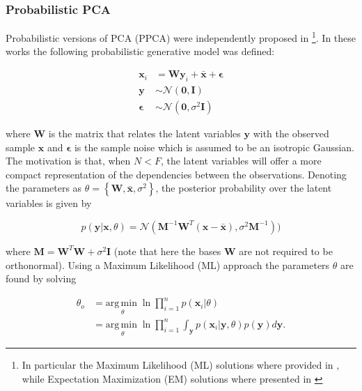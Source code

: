 
\subsubsection{Probabilistic PCA}
\label{sec:PPCA}

Probabilistic versions of PCA (PPCA) were independently proposed in \cite{Moghaddam1997,Roweis1998,Tipping1999} \footnote{In particular the Maximum Likelihood (ML)  solutions where provided  in \cite{Moghaddam1997,Tipping1999}, while Expectation Maximization (EM) solutions where presented in \cite{Roweis1998, Tipping1999}}. In these works the following probabilistic generative model was defined:

\begin{equation}
	\begin{aligned}
		\mathbf{x}_i & = \mathbf{W}\mathbf{y}_i + \bar{\mathbf{x}} + \boldsymbol{\epsilon}
		\\
		\mathbf{y} & \sim \mathcal{N}(\mathbf{0},\boldsymbol{\mathbf{I}}) 
		\\
		\boldsymbol{\epsilon} & \sim \mathcal{N}(\mathbf{0},\sigma^2\mathbf{I})
	\end{aligned}
	\label{eq:ppca_model}
\end{equation}

where $\mathbf{W}$ is the matrix that relates the latent variables $\mathbf{y}$ with the observed sample $\mathbf{x}$ and $\boldsymbol{\epsilon}$ is the sample noise which is assumed to be an isotropic Gaussian. The motivation is that, when $N < F$, the latent variables will offer a more compact representation of the dependencies between the observations. Denoting the parameters as $\theta = \left\{ \mathbf{W}, \bar{\mathbf{x}}, \sigma^2 \right\}$, the posterior probability over the latent variables is given by

\begin{equation}
p(\mathbf{y} | \mathbf{x}, \theta) = \mathcal{N} \left( \mathbf{M}^{-1} \mathbf{W}^T (\mathbf{x} - \bar{\mathbf{x}}), \sigma^2 \mathbf{M}^{-1} \right))
\end{equation}

where $\mathbf{M} = \mathbf{W}^T\mathbf{W} + \sigma^2 \mathbf{I}$ (note that here the bases $\mathbf{W}$ are not required to be orthonormal). Using a Maximum Likelihood (ML) approach the parameters $\theta$ are found by solving

\begin{equation}
	\begin{aligned}
		\theta_o & = \underset{\theta}{\mathrm{arg\,min\;}} \ln \prod_{i=1}^n p(\mathbf{x}_i|\theta)
		\\
		& = \underset{\theta}{\mathrm{arg\,min\;}} \ln \prod_{i=1}^n \int_{\mathbf{y}} p(\mathbf{x}_i|\mathbf{y},\theta) p(\mathbf{y}) d\mathbf{y}.
	\end{aligned}
\end{equation}

